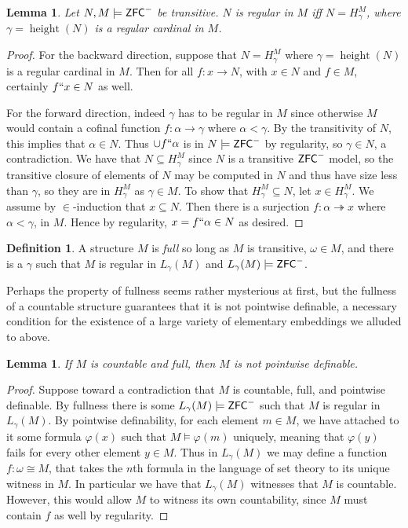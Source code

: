 \documentclass{amsart}
\newtheorem{lemma}[theorem]{Lemma}
\theoremstyle{definition}
\newtheorem{definition}[theorem]{Definition}
\theoremstyle{remark}
\newcommand{\ZFC}{\textup{\ensuremath{\textsf{ZFC}}}}
\DeclareMathOperator{\height}{height}
\newcommand{\To}{\longrightarrow}
\begin{document}
\begin{lemma} \label{lemma:regularityequiv}
Let $N, M \models \ZFC^-$ be transitive. $N$ is regular in $M$ iff $N = H_\gamma^M$, where $\gamma = \height(N)$ is a regular cardinal in $M$. 
\end{lemma}
\begin{proof}
For the backward direction, suppose that $N=H_\gamma^M$ where $\gamma = \height(N)$ is a regular cardinal in $M$. Then for all $f: x \To N$, with $x \in N$ and $f \in M$, certainly $f``x \in N$ as well.

For the forward direction, indeed $\gamma$ has to be regular in $M$ since otherwise $M$ would contain a cofinal function $f: \alpha \To \gamma$ where $\alpha < \gamma$. By the transitivity of $N$, this implies that $\alpha \in N$. Thus $\cup f``\alpha$ is in $N \models \ZFC^-$ by regularity, so $\gamma \in N$, a contradiction.
We have that $N \subseteq H_{\gamma}^M$ since $N$ is a transitive $\ZFC^-$ model, so the transitive closure of elements of $N$ may be computed in $N$ and thus have size less than $\gamma$, so they are in $H_\gamma^M$ as $\gamma \in M$. To show that $H_{\gamma}^M \subseteq N$, let $x \in H_{\gamma}^M$. We assume by $\in$-induction that $x \subseteq N$. Then there is a surjection $f: \alpha \twoheadrightarrow x$ where $\alpha < \gamma$, in $M$. Hence by regularity, $x = f``\alpha \in N$ as desired.
\end{proof}

\begin{definition} A structure $M$ is \emph{full} so long as $M$ is transitive, $\omega \in M$, and there is a $\gamma$ such that $M$ is regular in $L_\gamma(M)$ and $L_\gamma(M) \models \ZFC^-$.
\end{definition}

Perhaps the property of fullness seems rather mysterious at first, but the fullness of a countable structure guarantees that it is not pointwise definable, a necessary condition for the existence
of a large variety of elementary embeddings we alluded to above.

\begin{lemma} If $M$ is countable and full, then $M$ is not pointwise definable. \end{lemma}
\begin{proof} Suppose toward a contradiction that $M$ is countable, full, and pointwise definable. By fullness there is some $L_\gamma(M) \models \ZFC^-$ such that $M$ is regular in $L_\gamma(M)$. By pointwise definability, for each element $m \in M$, we have attached to it some formula $\varphi(x)$ such that $M \models \varphi(m)$ uniquely, meaning that $\varphi(y)$ fails for every other element $y \in M$. Thus in $L_\gamma(M)$ we may define a function $f: \omega \cong M$, that takes the $n$th formula in the language of set theory to its unique witness in $M$. In particular we have that $L_\gamma(M)$ witnesses that $M$ is countable. However, this would allow $M$ to witness its own countability, since $M$ must contain $f$ as well by regularity. \end{proof} 
\end{document}
